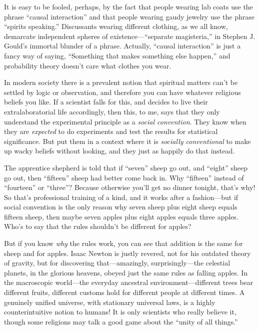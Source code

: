{
 It is easy to be fooled, perhaps, by the fact that people wearing
lab coats use the phrase ``causal
interaction'' and that people wearing gaudy jewelry
use the phrase ``spirits speaking.''
Discussants wearing different clothing, as we all know, demarcate
independent spheres of existence---``separate
magisteria,'' in Stephen J. Gould's
immortal blunder of a phrase. Actually, ``causal
interaction'' is just a fancy way of saying,
``Something that makes something else
happen,'' and probability theory
doesn't care what clothes you wear.}

{
 In modern society there is a prevalent notion that spiritual
matters can't be settled by logic or observation, and
therefore you can have whatever religious beliefs you like. If a
scientist falls for this, and decides to live their extralaboratorial
life accordingly, then this, to me, says that they only understand the
experimental principle as a \textit{social convention}. They know when
they are \textit{expected} to do experiments and test the results for
statistical significance. But put them in a context where it is
\textit{socially conventional} to make up wacky beliefs without
looking, and they just as happily do that instead.}

{
 The apprentice shepherd is told that if
``seven'' sheep go out, and
``eight'' sheep go out, then
``fifteen'' sheep had better come
back in. Why ``fifteen'' instead of
``fourteen'' or
``three''? Because otherwise
you'll get no dinner tonight, that's
why! So that's professional training of a kind, and it
works after a fashion---but if social convention is the only reason why
seven sheep plus eight sheep equals fifteen sheep, then maybe seven
apples plus eight apples equals three apples. Who's to
say that the rules shouldn't be different for apples?}

{
 But if you know \textit{why} the rules work, you can see that
addition is the same for sheep and for apples. Isaac Newton is justly
revered, not for his outdated theory of gravity, but for discovering
that---amazingly, surprisingly---the celestial planets, in the glorious
heavens, obeyed just the same rules as falling apples. In the
macroscopic world---the everyday ancestral environment---different
trees bear different fruits, different customs hold for different
people at different times. A genuinely unified universe, with
stationary universal laws, is a highly counterintuitive notion to
humans! It is only scientists who really believe it, though some
religions may talk a good game about the ``unity of
all things.''}

